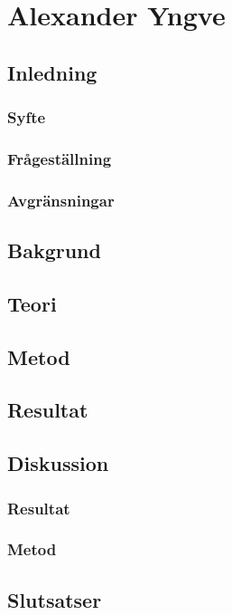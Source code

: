 \section{Alexander Yngve}
	\subsection{Inledning}
	\subsubsection{Syfte}
	\subsubsection{Frågeställning}
	\subsubsection{Avgränsningar}
	\subsection{Bakgrund}
	\subsection{Teori}
	\subsection{Metod}
	\subsection{Resultat}
	\subsection{Diskussion}
	\subsubsection{Resultat}
	\subsubsection{Metod}
	\subsection{Slutsatser}
